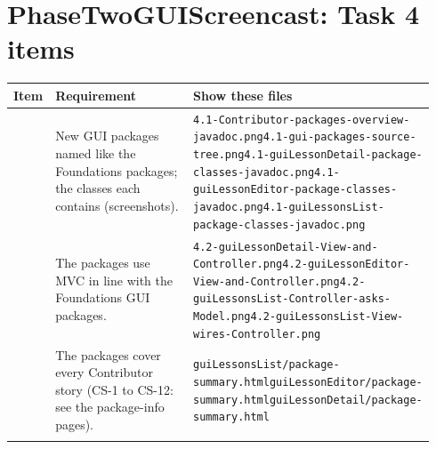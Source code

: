 \documentclass[10pt]{article}
\begin{document}
\section*{PhaseTwoGUIScreencast: Task 4 items}
\setlength{\tabcolsep}{4pt}\begin{longtable}{@{}>{\raggedright\arraybackslash}p{0.07\linewidth} >{\raggedright\arraybackslash}p{0.33\linewidth} >{\raggedright\arraybackslash}p{0.54\linewidth}@{}}
\toprule\textbf{Item} & \textbf{Requirement} & \textbf{Show these files} \\\midrule\endhead
4.1 & New GUI packages named like the Foundations packages; the classes each contains (screenshots). & {\scriptsize \texttt{4.1-Contributor-packages-overview-javadoc.png}\newline \texttt{4.1-gui-packages-source-tree.png}\newline \texttt{4.1-guiLessonDetail-package-classes-javadoc.png}\newline \texttt{4.1-guiLessonEditor-package-classes-javadoc.png}\newline \texttt{4.1-guiLessonsList-package-classes-javadoc.png}} \\ \addlinespace[3pt]
4.2 & The packages use MVC in line with the Foundations GUI packages. & {\scriptsize \texttt{4.2-guiLessonDetail-View-and-Controller.png}\newline \texttt{4.2-guiLessonEditor-View-and-Controller.png}\newline \texttt{4.2-guiLessonsList-Controller-asks-Model.png}\newline \texttt{4.2-guiLessonsList-View-wires-Controller.png}} \\ \addlinespace[3pt]
4.3 & The packages cover every Contributor story (CS-1 to CS-12: see the package-info pages). & {\scriptsize \texttt{guiLessonsList/package-summary.html}\newline \texttt{guiLessonEditor/package-summary.html}\newline \texttt{guiLessonDetail/package-summary.html}} \\ \addlinespace[3pt]

\end{longtable}
\end{document}

